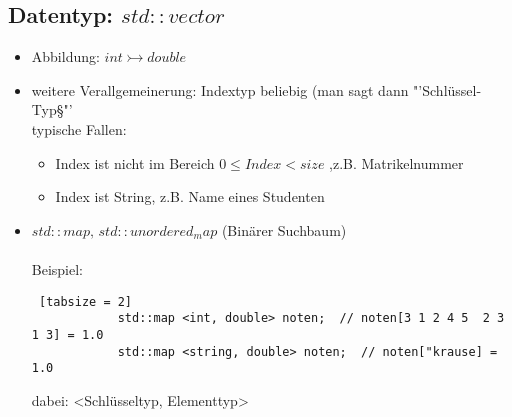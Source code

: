 \documentclass{article}
\begin{document}
	 	\subsection{Datentyp: $std::vector$}
	 	
	 	\begin{itemize}
	 	\begin{lstlisting} [tabsize = 2]
	 		#include <vector>
	 		
	 		std::vector <double> v(20, 0.0) ;  // initialisiert mit Groesse, Initialwert
	 		
	 		// analog: std::vector<int>, std::vector<std::string>
	 	\end{lstlisting}
	 	\item Abbildung: $int \rightarrowtail double$
	 	
	 	\item weitere Verallgemeinerung: Indextyp beliebig (man sagt dann "'Schlüssel-Typ§"' \\
	 	typische Fallen:
	 	\begin{itemize}
	 		\item Index ist nicht im Bereich $0 \leq Index < size$ ,z.B. Matrikelnummer
	 		\item Index ist String, z.B. Name eines Studenten
	 	\end{itemize}
	 	\item $std::map, \, std::unordered_map$ (Binärer Suchbaum) \\ \\
	 	 Beispiel:
	 	 \begin{lstlisting} [tabsize = 2]
	 	 	std::map <int, double> noten;  // noten[3 1 2 4 5  2 3 1 3] = 1.0
	 	 	std::map <string, double> noten;  // noten["krause] = 1.0
	 	 \end{lstlisting}
	 	 dabei: <Schlüsseltyp, Elementtyp>
	 \end{itemize}
	 
\end{document}
